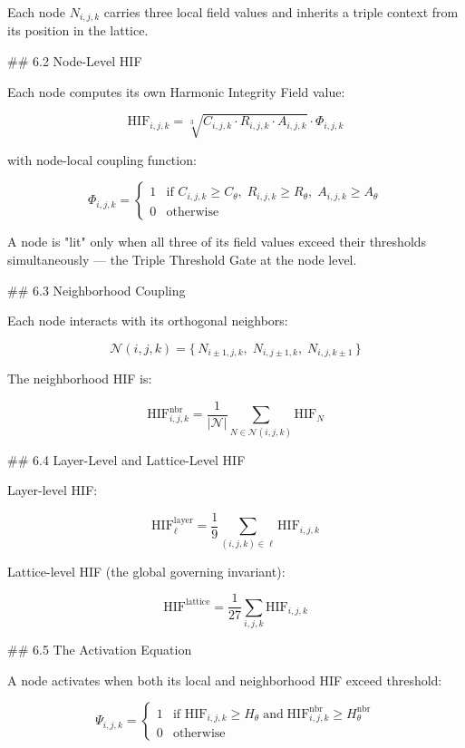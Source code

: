 Each node \(N_{i,j,k}\) carries three local field values and inherits a triple
context from its position in the lattice.

## 6.2 Node-Level HIF

Each node computes its own Harmonic Integrity Field value:

\[
\mathrm{HIF}_{i,j,k} = \sqrt[3]{C_{i,j,k} \cdot R_{i,j,k} \cdot A_{i,j,k}}
\cdot \Phi_{i,j,k}
\]

with node-local coupling function:

\[
\Phi_{i,j,k} =
\begin{cases}
1 & \text{if } C_{i,j,k} \ge C_{\theta},\; R_{i,j,k} \ge R_{\theta},\;
A_{i,j,k} \ge A_{\theta} \\
0 & \text{otherwise}
\end{cases}
\]

A node is "lit" only when all three of its field values exceed their thresholds
simultaneously — the Triple Threshold Gate at the node level.

## 6.3 Neighborhood Coupling

Each node interacts with its orthogonal neighbors:

\[
\mathcal{N}(i,j,k) = \{\, N_{i\pm1,j,k},\; N_{i,j\pm1,k},\; N_{i,j,k\pm1} \,\}
\]

The neighborhood HIF is:

\[
\mathrm{HIF}^{\text{nbr}}_{i,j,k} = \frac{1}{|\mathcal{N}|} \sum_{N \in
\mathcal{N}(i,j,k)} \mathrm{HIF}_N
\]

## 6.4 Layer-Level and Lattice-Level HIF

Layer-level HIF:

\[
\mathrm{HIF}^{\text{layer}}_{\ell} = \frac{1}{9} \sum_{(i,j,k) \in \ell}
\mathrm{HIF}_{i,j,k}
\]

Lattice-level HIF (the global governing invariant):

\[
\mathrm{HIF}^{\text{lattice}} = \frac{1}{27} \sum_{i,j,k} \mathrm{HIF}_{i,j,k}
\]

## 6.5 The Activation Equation

A node activates when both its local and neighborhood HIF exceed threshold:

\[
\Psi_{i,j,k} =
\begin{cases}
1 & \text{if } \mathrm{HIF}_{i,j,k} \ge H_{\theta} \;\text{and}\;
\mathrm{HIF}^{\text{nbr}}_{i,j,k} \ge H_{\theta}^{\text{nbr}} \\
0 & \text{otherwise}
\end{cases}
\]

